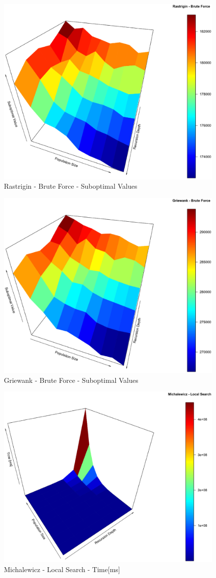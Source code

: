 \documentclass{svproc}
\begin{document}
\begin{figure}[tbp]
\centering
\includegraphics[width=1.0\hsize,height=0.65\hsize]{fig27.eps}
\caption{Rastrigin - Brute Force - Suboptimal Values}
\label{fig09}
\end{figure}

\begin{figure}[tbp]
\centering
\includegraphics[width=1.0\hsize,height=0.65\hsize]{fig30.eps}
\caption{Griewank - Brute Force - Suboptimal Values}
\label{fig10}
\end{figure}

\begin{figure}[tbp]
\centering
\includegraphics[width=1.0\hsize,height=0.65\hsize]{fig02.eps}
\caption{Michalewicz - Local Search - Time[ms]}
\label{fig11}
\end{figure}
\end{document}
